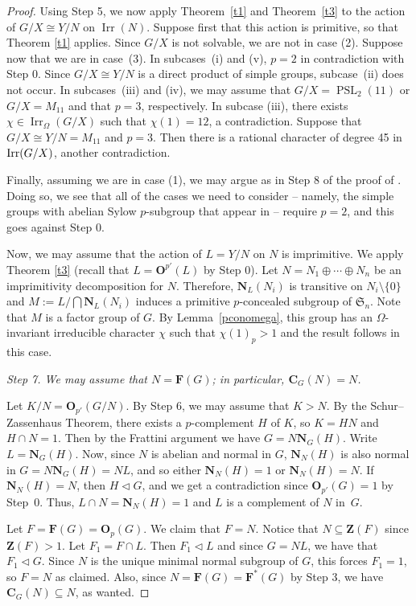 \documentclass[12pt]{amsart}
\theoremstyle{theorem}
\theoremstyle{definition}
\newcommand{\fS} {\mathfrak S}
\newcommand{\bC} {\mathbf C}
\newcommand{\bF} {\mathbf F}
\newcommand{\bO}{{\mathbf O}}
\newcommand{\bN} {\mathbf N}
\newcommand{\bZ} {\mathbf Z}
\newcommand{\Irr}{{\operatorname{Irr}}}
\newcommand{\PSL}{\operatorname{PSL}}
\begin{document}
\begin{proof}
		Using Step 5, we now apply Theorem~\ref{t1} and Theorem~\ref{t3} to the action
		of $G/X\cong Y/N$ on $\Irr(N)$. Suppose first that this action is primitive, so
		that Theorem \ref{t1} applies. 
		Since $G/X$ is not solvable, we are not in case (2). Suppose now that we are in
		case~(3). In subcases~(i) and (v), $p=2$ in contradiction with Step 0. Since $G/X\cong Y/N$ is a direct product of simple groups, subcase~(ii) does
		not occur. In subcases~(iii) and (iv), we may assume that $G/X=\PSL_2(11)$ or $G/X=M_{11}$ and that $p=3$, respectively.
		In subcase (iii), there exists $\chi\in\Irr_\Omega(G/X)$ such that $\chi(1)=12$, a contradiction. Suppose that $G/X\cong Y/N=M_{11}$ and $p=3$. Then there is a rational character of degree 45 in ${\rm Irr}(G/X)$, another contradiction.
		\medskip
		
		Finally, assuming we are in case (1), we may argue as in Step 8 of the proof of \cite[Theorem 4.6]{MinimalHeights}. Doing so, we see that all of the cases we need to consider -- namely, the simple groups with abelian Sylow $p$-subgroup that appear in \cite[Appendix~1]{liebeck} -- require $p = 2$, and this goes against Step 0.
		\medskip
		
		Now, we may assume that the action of $L=Y/N$ on $N$ is imprimitive. 
		We apply Theorem \ref{t3} (recall that $L=\bO^{p'}(L)$ by Step 0). Let
		$N=N_1\oplus\cdots\oplus N_n$ be an imprimitivity decomposition for $N$.
		Therefore, $\bN_L(N_i)$ is transitive on $N_i\setminus\{0\}$ and
		$M:=L/\bigcap\bN_L(N_i)$ induces a primitive $p$-concealed subgroup of $\fS_n$.
		Note that $M$ is a factor group of $G$. By Lemma~\ref{pconomega}, this group has an $\Omega$-invariant
		irreducible character $\chi$ such that $\chi(1)_p>1$ and the result follows in
		this case.
		\bigskip
		
		\textit{Step 7. We may assume that $N=\bF(G)$; in particular, $\bC_G(N)=N$.}
		\medskip
		
		Let $K/N=\bO_{p'}(G/N)$. By Step 6, we may assume that $K>N$. By the
		Schur--Zassenhaus Theorem, there exists a $p$-complement $H$ of $K$, so $K=HN$
		and $H\cap N=1$. Then by the Frattini argument we have $G=N\bN_G(H)$.
		Write $L=\bN_G(H)$. Now, since $N$ is abelian and normal in $G$, $\bN_N(H)$ is also
		normal in $G=N\bN_G(H)=NL$, and so either $\bN_N(H) =1$ or $\bN_N(H) = N$. If
		$\bN_N(H)=N$, then $H\lhd G$, and we get a contradiction since $\bO_{p'}(G)=1$
		by Step~0. Thus, $L\cap N=\bN_N(H) =1$ and $L$ is a complement of $N$ in~$G$.
		
		Let $F=\bF(G)=\bO_p(G)$. We claim that $F=N$. Notice that $N\subseteq\bZ(F)$
		since $\bZ(F)>1$. Let $F_1=F\cap L$. Then $F_1\lhd L$ and since $G=NL$, we have
		that $F_1\lhd G$. Since $N$ is the unique minimal normal subgroup of $G$, this forces
		$F_1=1$, so $F=N$ as claimed. Also, since $N=\bF(G)=\bF^*(G)$ by Step 3, we have
		$\bC_G(N)\subseteq N$, as wanted.
		\bigskip
		

\end{proof}
\end{document}

